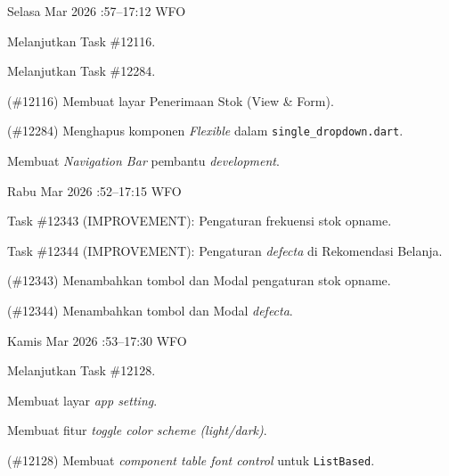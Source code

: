 \begin{logtable}
    {
        Selasa  Mar 2026 :57--17:12 \linebreak
        WFO
    }{
        \begin{loglist}
            \item Melanjutkan Task \#12116.
            \item Melanjutkan Task \#12284.
        \end{loglist}
    }{
        \begin{logwork}
            \item (\#12116) Membuat layar Penerimaan Stok (View \& Form).
            \item (\#12284) Menghapus komponen \textit{Flexible} dalam \texttt{single\_dropdown.dart}.
            \item Membuat \textit{Navigation Bar} pembantu \textit{development}.
        \end{logwork}
    }

    {
        Rabu  Mar 2026 :52--17:15 \linebreak
        WFO
    }{
        \begin{loglist}
            \item Task \#12343 (IMPROVEMENT): Pengaturan frekuensi stok opname.
            \item Task \#12344 (IMPROVEMENT): Pengaturan \textit{defecta} di Rekomendasi Belanja.
        \end{loglist}
    }{
        \begin{logwork}
            \item (\#12343) Menambahkan tombol dan Modal pengaturan stok opname.
            \item (\#12344) Menambahkan tombol dan Modal \textit{defecta}.
        \end{logwork}
    }

    {
        Kamis  Mar 2026 :53--17:30 \linebreak
        WFO
    }{
        \begin{loglist}
            \item Melanjutkan Task \#12128.
            \item Membuat layar \textit{app setting}.
        \end{loglist}
    }{
        \begin{logwork}
            \item Membuat fitur \textit{toggle color scheme (light/dark)}.
            \item (\#12128) Membuat \textit{component table font control} untuk \texttt{ListBased}.
        \end{logwork}
    }


\end{logtable}
